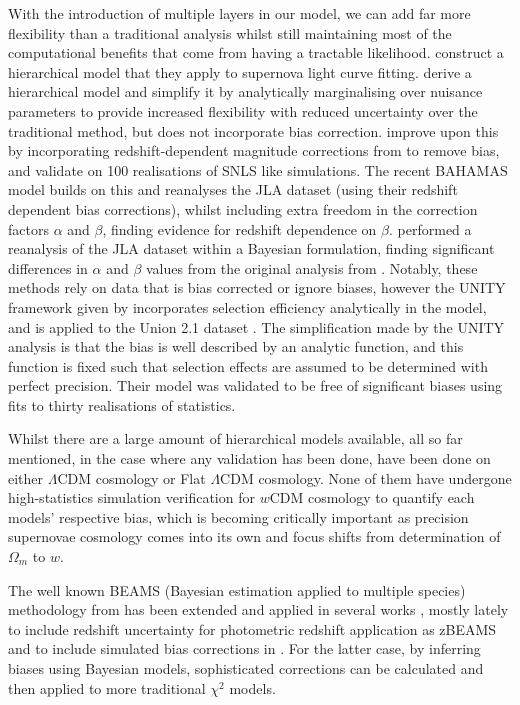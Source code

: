 \documentclass[a4paper,fleqn,usenatbib]{mnras}
\begin{document}
With the introduction of multiple layers in our model, we can add far more flexibility than a traditional analysis whilst still maintaining most of the computational benefits that come from having a tractable likelihood. \citet{Mandel2009, Mandel2011a, Mandel2017} construct a hierarchical model that they apply to supernova light curve fitting. \citet{March2011} derive a hierarchical model and simplify it by analytically marginalising over nuisance parameters to provide increased flexibility with reduced uncertainty over the traditional method, but does not incorporate bias correction. \citet{March2014, Karpenka2015} improve upon this by incorporating redshift-dependent magnitude corrections from \citet{Perrett2010} to remove bias, and validate on 100 realisations of SNLS like simulations. The recent BAHAMAS model \citep{Shariff2016} builds on this and reanalyses the JLA dataset (using their redshift dependent bias corrections), whilst including extra freedom in the correction factors $\alpha$ and $\beta$, finding evidence for redshift dependence on $\beta$. \citet{Ma2016} performed a reanalysis of the JLA dataset within a Bayesian formulation, finding significant differences in $\alpha$ and $\beta$ values from the original analysis from \citet{Betoule2014}. Notably, these methods rely on data that is bias corrected or ignore biases, however the UNITY framework given by \citet{Rubin2015} incorporates selection efficiency analytically in the model, and is applied to the Union 2.1 dataset \citep{Suzuki2012}. The simplification made by the UNITY analysis is that the bias is well described by an analytic function, and this function is fixed such that selection effects are assumed to be determined with perfect precision. Their model was validated to be free of significant biases using fits to thirty realisations of statistics. 

Whilst there are a large amount of hierarchical models available, all so far mentioned, in the case where any validation has been done, have been done on either $\Lambda$CDM cosmology or Flat $\Lambda$CDM cosmology. None of them have undergone high-statistics simulation verification for $w$CDM cosmology to quantify each models' respective bias, which is becoming critically important as precision supernovae cosmology comes into its own and focus shifts from determination of $\Omega_m$ to $w$.

The well known BEAMS (Bayesian estimation applied to multiple species) methodology from \citet{Kunz2007} has been extended and applied in several works \citep{Hlozek2012}, mostly lately to include redshift uncertainty for photometric redshift application as zBEAMS \citep{Roberts2017} and to include simulated bias corrections in \citet{Kessler2017}. For the latter case, by inferring biases using Bayesian models, sophisticated corrections can be calculated and then applied to more traditional $\chi^2$ models.
\end{document}
